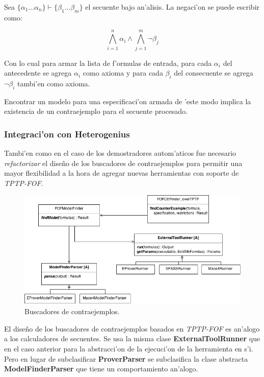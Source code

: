 Sea $\{\alpha_1 \dots \alpha_n\} \vdash \{\beta_1 \dots \beta_m\}$ el secuente bajo an'alisis.
La negaci'on se puede escribir como:

\begin{equation}
\bigwedge\limits_{i=1}^n{\alpha_i} \wedge \bigwedge\limits_{j=1}^m{\neg \beta_{j}}
\end{equation}

Con lo cual para armar la lista de f'ormulas de entrada, para cada $\alpha_{i}$ del antecedente se agrega $\alpha_{i}$ como axioma y para cada $\beta_{i}$ del consecuente se agrega $\neg \beta_{i}$ tambi'en como axioma.

Encontrar un modelo para una especificaci'on armada de 'este modo implica la existencia de un contraejemplo para el secuente procesado.


\subsubsection{Integraci'on con Heterogenius}

Tambi'en como en el caso de los demostradores autom'aticos fue necesario \textit{refactorizar} el diseño de los buscadores de contraejemplos para permitir una mayor flexibilidad a la hora de agregar nuevas herramientas con soporte de \textit{TPTP-FOF}.

\begin{figure}[H]
	\includegraphics[width=450px, angle=90]{img/arq_ce.png}
	\centering
	\caption{Buscadores de contraejemplos.}
\end{figure}

El diseño de los buscadores de contraejemplos basados en \textit{TPTP-FOF} es an'alogo a los calculadores de secuentes. Se usa la misma clase \textbf{ExternalToolRunner} que en el caso anterior para la abstracci'on de la ejecuci'on de la herramienta en s'i. Pero en lugar de subclasificar \textbf{ProverParser} se subclasifica la clase abstracta \textbf{ModelFinderParser} que tiene un comportamiento an'alogo.